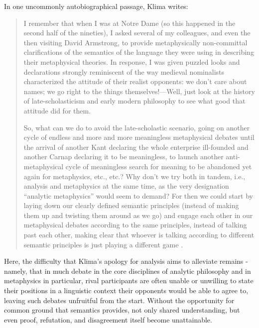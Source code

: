 \documentclass[]{article}
\begin{document}
In one uncommonly autobiographical passage, Klima writes: 
\begin{quote}
I remember that when I was at Notre Dame (so this happened in the second
half of the nineties), I asked several of my colleagues, and even the then
visiting David Armstrong, to provide metaphysically non-committal
clarifications of the semantics of the language they were using in
describing their metaphysical theories. In response, I was given puzzled
looks and declarations strongly reminiscent of the way medieval
nominalists characterized the attitude of their realist opponents: we don’t
care about names; we go right to the things themselves!—Well, just look 
at the history of late-scholasticism and early modern philosophy to see
what good that attitude did for them.

So, what can we do to avoid the late-scholastic scenario, going on another
cycle of endless and more and more meaningless metaphysical debates
until the arrival of another Kant declaring the whole enterprise ill-founded
and another Carnap declaring it to be meaningless, to launch another anti-metaphysical cycle of meaningless search for meaning to be abandoned
yet again for metaphysics, etc., etc.? Why don’t we try both in tandem,
i.e., analysis and metaphysics at the same time, as the very designation
“analytic metaphysics” would seem to demand? For then we could start by
laying down our clearly defined semantic principles (instead of making
them up and twisting them around as we go) and engage each other in our
metaphysical debates according to the same principles, instead of talking
past each other, making clear that whoever is talking according to different
semantic principles is just playing a different game \autocite[86-87]{Klima2014}.
\end{quote}

Here, the difficulty that Klima's apology for analysis aims to alleviate remains - 
namely, that in much debate in the core disciplines of analytic philosophy  
and in metaphysics in particular, 
rival participants are often unable or unwilling to state their positions in a linguistic context their opponents would be able to agree to, 
leaving such debates unfruitful from the start. 
Without the opportunity for common ground that semantics provides, 
not only shared understanding, 
but even proof, refutation, 
and disagreement itself become unattainable.
\end{document}
